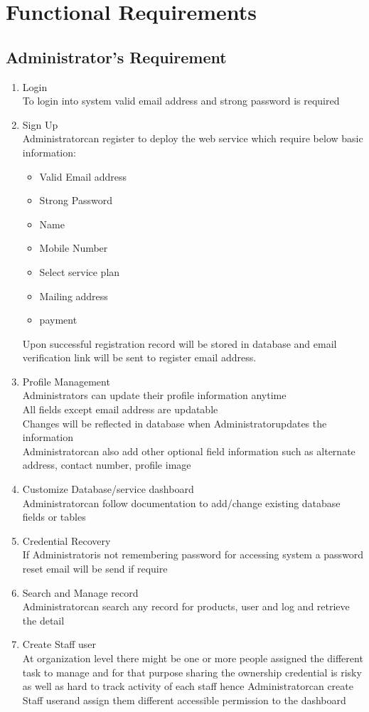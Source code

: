 \documentclass{scrreprt}
\newcommand*\arrow{\item[$\Rightarrow$]}
\def\admin{Administrator}
\def\staff{Staff user}
\begin{document}
\section{Functional Requirements}
\label{functions}
\subsection{\admin's Requirement}
\begin{enumerate}[start=1,label={\bfseries REQ \arabic*:}]
	\addtolength{\itemindent}{40pt}
	\item Login
		\\To login into system valid email address and strong password is required
	\item Sign Up
		\\ \admin\space can register to deploy the web service which require below basic information:
		\begin{itemize}
			\arrow Valid Email address
			\arrow Strong Password
			\arrow Name
			\arrow Mobile Number
			\arrow Select service plan
			\arrow Mailing address
			\arrow payment
		\end{itemize}
		Upon successful registration record will be stored in database and email verification link will be sent to register email address.
	\item Profile Management
		\\ \admin s can update their profile information anytime
		\\All fields except email address are updatable
		\\Changes will be reflected in database when \admin \space updates the information
		\\ \admin can also add other optional field information such as alternate address, contact number, profile image
	\item Customize Database/service dashboard
		\\ \admin \space can follow documentation to add/change existing database fields or tables
	\item Credential Recovery
		\\If \admin \space is not remembering password for accessing system a password reset email will be send if require 
	\item Search and Manage record
		\\ \admin \space can search any record for products, user and log and retrieve the detail 
	\item Create \staff
		\\At organization level there might be one or more people assigned the different task to manage and for that purpose sharing the ownership credential is risky as well as hard to track activity of each staff hence \admin \space can create \staff \space and assign them different accessible permission to the dashboard

\end{enumerate}
\end{document}
